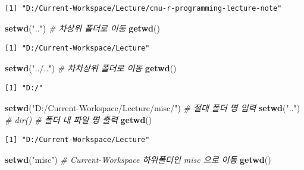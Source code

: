 \documentclass[
  11pt,
]{krantz}
\newenvironment{Shaded}{\begin{snugshade}}{\end{snugshade}}
\newcommand{\CommentTok}[1]{\textcolor[rgb]{0.37,0.37,0.37}{\textit{#1}}}
\newcommand{\KeywordTok}[1]{\textcolor[rgb]{0.27,0.27,0.27}{\textbf{#1}}}
\newcommand{\NormalTok}[1]{#1}
\newcommand{\StringTok}[1]{\textcolor[rgb]{0.5,0.5,0.5}{#1}}
\begin{document}
\begin{verbatim}
[1] "D:/Current-Workspace/Lecture/cnu-r-programming-lecture-note"
\end{verbatim}

\normalsize

\footnotesize

\begin{Shaded}
\begin{Highlighting}[]
\KeywordTok{setwd}\NormalTok{(}\StringTok{".."}\NormalTok{) }\CommentTok{# 차상위 폴더로 이동}
\KeywordTok{getwd}\NormalTok{()}
\end{Highlighting}
\end{Shaded}

\begin{verbatim}
[1] "D:/Current-Workspace/Lecture"
\end{verbatim}

\begin{Shaded}
\begin{Highlighting}[]
\KeywordTok{setwd}\NormalTok{(}\StringTok{"../.."}\NormalTok{) }\CommentTok{# 차차상위 폴더로 이동}
\KeywordTok{getwd}\NormalTok{()}
\end{Highlighting}
\end{Shaded}

\begin{verbatim}
[1] "D:/"
\end{verbatim}

\begin{Shaded}
\begin{Highlighting}[]
\KeywordTok{setwd}\NormalTok{(}\StringTok{"D:/Current-Workspace/Lecture/misc/"}\NormalTok{) }\CommentTok{# 절대 폴더 명 입력}
\KeywordTok{setwd}\NormalTok{(}\StringTok{".."}\NormalTok{)}
\CommentTok{# dir() # 폴더 내 파일 명 출력}
\KeywordTok{getwd}\NormalTok{()}
\end{Highlighting}
\end{Shaded}

\begin{verbatim}
[1] "D:/Current-Workspace/Lecture"
\end{verbatim}

\begin{Shaded}
\begin{Highlighting}[]
\KeywordTok{setwd}\NormalTok{(}\StringTok{"misc"}\NormalTok{) }\CommentTok{# Current-Workspace 하위폴더인 misc 으로 이동}
\KeywordTok{getwd}\NormalTok{()}
\end{Highlighting}
\end{Shaded}
\end{document}
